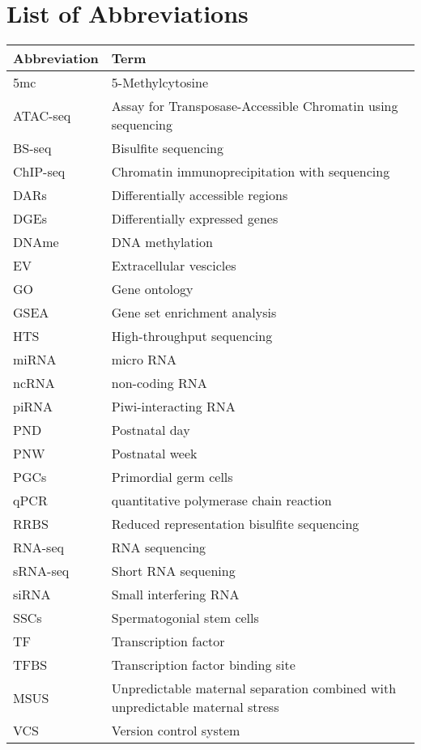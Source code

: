 \documentclass[12pt,twoside]{reedthesis}
\begin{document}
\begin{acknowledgements}
  \end{acknowledgements}

  \hypersetup{linkcolor=black}
  \setcounter{secnumdepth}{4}
  \setcounter{tocdepth}{4}
  \tableofcontents

  \listoftables

  \listoffigures



\mainmatter %
\pagestyle{fancyplain} %

\hypertarget{list-of-abbreviations}{%
\chapter*{List of Abbreviations}\label{list-of-abbreviations}}
\begin{tabular}{ll}
\toprule
Abbreviation & Term\\
\midrule
5mc & 5-Methylcytosine\\
ATAC-seq & Assay for Transposase-Accessible Chromatin using sequencing\\
BS-seq & Bisulfite sequencing\\
ChIP-seq & Chromatin immunoprecipitation with sequencing\\
DARs & Differentially accessible regions\\
\addlinespace
DGEs & Differentially expressed genes\\
DNAme & DNA methylation\\
EV & Extracellular vescicles\\
GO & Gene ontology\\
GSEA & Gene set enrichment analysis\\
\addlinespace
HTS & High-throughput sequencing\\
miRNA & micro RNA\\
ncRNA & non-coding RNA\\
piRNA & Piwi-interacting RNA\\
PND & Postnatal day\\
\addlinespace
PNW & Postnatal week\\
PGCs & Primordial germ cells\\
qPCR & quantitative polymerase chain reaction\\
RRBS & Reduced representation bisulfite sequencing\\
RNA-seq & RNA sequencing\\
\addlinespace
sRNA-seq & Short RNA sequening\\
siRNA & Small interfering RNA\\
SSCs & Spermatogonial stem cells\\
TF & Transcription factor\\
TFBS & Transcription factor binding site\\
\addlinespace
MSUS & Unpredictable maternal separation combined with unpredictable maternal stress\\
VCS & Version control system\\
\bottomrule
\end{tabular}
\end{document}
